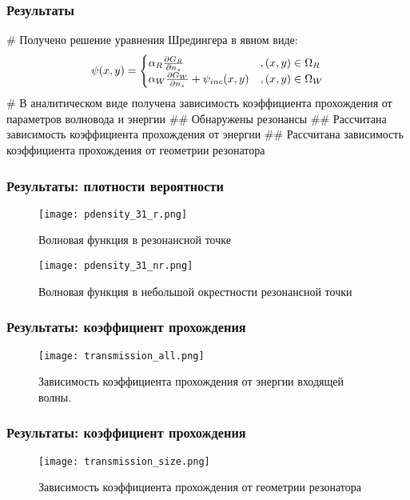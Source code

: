 \documentclass{beamer}
\begin{document}
\begin{frame}[fragile]
\frametitle{Результаты}
\begin{easylist}[itemize]
# Получено решение уравнения Шредингера в явном виде:
\[
\psi(x, y) =
\begin{cases}
\alpha_R \pdv{G_R}{n_s} (x, y, x_0, y_0; k) &, (x, y) \in \Omega_R \\
\alpha_W \pdv{G_W}{n_s} (x, y, x_0, y_0; k) + \psi_{inc}(x, y) &, (x, y) \in \Omega_W  
\end{cases}
\]
# В аналитическом виде получена зависимость коэффициента прохождения от параметров волновода и энергии
## Обнаружены резонансы
## Рассчитана зависимость коэффициента прохождения от энергии
## Рассчитана зависимость коэффициента прохождения от геометрии резонатора
\end{easylist}
\end{frame}

\begin{frame}[fragile]
\frametitle{Результаты: плотности вероятности}
\begin{figure}
\texttt{[image: pdensity\_31\_r.png]}
\caption{Волновая функция в резонансной точке}
\end{figure}
\begin{figure}
\texttt{[image: pdensity\_31\_nr.png]}
\caption{Волновая функция в небольшой окрестности резонансной точки}
\end{figure}
\end{frame}


\begin{frame}[fragile]
\frametitle{Результаты: коэффициент прохождения}
\begin{figure}
\texttt{[image: transmission\_all.png]}
\caption{Зависимость коэффициента прохождения от энергии входящей волны.}
\end{figure}
\end{frame}

\begin{frame}[fragile]
\frametitle{Результаты: коэффициент прохождения}
\begin{figure}
\texttt{[image: transmission\_size.png]}
\caption{Зависимость коэффициента прохождения от геометрии резонатора}
\end{figure}
\end{frame}


\end{document}
